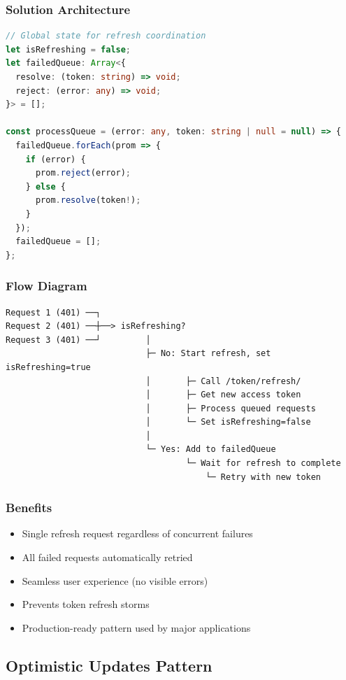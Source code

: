 \documentclass[11pt,a4paper]{article}
\begin{document}
\subsubsection{Solution Architecture}
\begin{lstlisting}[language=TypeScript]
// Global state for refresh coordination
let isRefreshing = false;
let failedQueue: Array<{
  resolve: (token: string) => void;
  reject: (error: any) => void;
}> = [];

const processQueue = (error: any, token: string | null = null) => {
  failedQueue.forEach(prom => {
    if (error) {
      prom.reject(error);
    } else {
      prom.resolve(token!);
    }
  });
  failedQueue = [];
};
\end{lstlisting}

\subsubsection{Flow Diagram}
\begin{verbatim}
Request 1 (401) ──┐
Request 2 (401) ──┼──> isRefreshing? 
Request 3 (401) ──┘         │
                            ├─ No: Start refresh, set isRefreshing=true
                            │       ├─ Call /token/refresh/
                            │       ├─ Get new access token
                            │       ├─ Process queued requests
                            │       └─ Set isRefreshing=false
                            │
                            └─ Yes: Add to failedQueue
                                    └─ Wait for refresh to complete
                                        └─ Retry with new token
\end{verbatim}

\subsubsection{Benefits}
\begin{itemize}[leftmargin=*]
    \item Single refresh request regardless of concurrent failures
    \item All failed requests automatically retried
    \item Seamless user experience (no visible errors)
    \item Prevents token refresh storms
    \item Production-ready pattern used by major applications
\end{itemize}

\subsection{Optimistic Updates Pattern}
\end{document}
